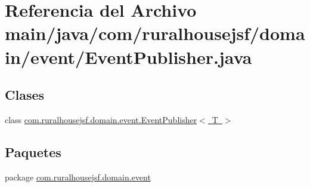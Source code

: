 \hypertarget{a00032}{}\section{Referencia del Archivo main/java/com/ruralhousejsf/domain/event/\+Event\+Publisher.java}
\label{a00032}
\subsection*{Clases}
\begin{DoxyCompactItemize}
\item 
class \mbox{\hyperlink{a00168}{com.\+ruralhousejsf.\+domain.\+event.\+Event\+Publisher$<$ T $>$}}
\end{DoxyCompactItemize}
\subsection*{Paquetes}
\begin{DoxyCompactItemize}
\item 
package \mbox{\hyperlink{a00115}{com.\+ruralhousejsf.\+domain.\+event}}
\end{DoxyCompactItemize}
